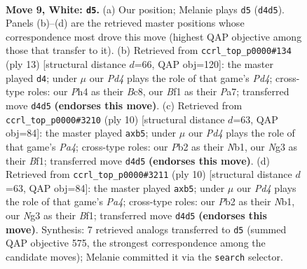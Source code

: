 \documentclass[11pt]{article}
\begin{document}
\clearpage

\begin{figure}[p]\centering
\begin{subfigure}{0.46\textwidth}\centering
\resizebox{\linewidth}{!}{%
\newchessgame
\chessboard[
  setfen={rn1qkbnr/pp4p1/2p3bp/4pp2/2PP3P/6NR/PP3PP1/R1BQKBN1 w Qkq - 0 9},
  showmover=false,
  pgfstyle=straightmove, color=movearrow, markmove={d4-d5}
]}
\caption{}
\end{subfigure}\hfill
\begin{subfigure}{0.46\textwidth}\centering
\resizebox{\linewidth}{!}{%
\newchessgame
\chessboard[
  setfen={rnbqkb1r/pp3ppp/5n2/3pp3/2P5/5NP1/PP2PPBP/RNBQK2R b KQkq - 1 7},
  showmover=false,
  pgfstyle=straightmove, color=movearrow, markmove={d5-d4}
]}
\caption{}
\end{subfigure}
\\[4pt]
\begin{subfigure}{0.46\textwidth}\centering
\resizebox{\linewidth}{!}{%
\newchessgame
\chessboard[
  setfen={rnbqkbnr/p4ppp/2p1p3/1p6/P1pPP3/5N2/1P3PPP/RNBQKB1R w KQkq - 0 6},
  showmover=false,
  pgfstyle=straightmove, color=movearrow, markmove={a4-b5}
]}
\caption{}
\end{subfigure}\hfill
\begin{subfigure}{0.46\textwidth}\centering
\resizebox{\linewidth}{!}{%
\newchessgame
\chessboard[
  setfen={rnbqkbnr/p4ppp/2p1p3/1p6/P1pPP3/5N2/1P3PPP/RNBQKB1R w KQkq - 0 6},
  showmover=false,
  pgfstyle=straightmove, color=movearrow, markmove={a4-b5}
]}
\caption{}
\end{subfigure}
\caption{\textbf{Move 9, White: \texttt{d5}.} (a) Our position; Melanie plays \texttt{d5} (\texttt{d4d5}). Panels (b)--(d) are the retrieved master positions whose correspondence most drove this move (highest QAP objective among those that transfer to it). (b) Retrieved from \texttt{ccrl\_top\_p0000\#134} (ply 13) [structural distance $d$=66, QAP obj=120]: the master played \texttt{d4}; under $\mu$ our \emph{Pd4} plays the role of that game's \emph{Pd4}; cross-type roles: our \emph{P}h4 as their \emph{B}c8, our \emph{B}f1 as their \emph{P}a7; transferred move \texttt{d4d5} \textbf{(endorses this move)}. (c) Retrieved from \texttt{ccrl\_top\_p0000\#3210} (ply 10) [structural distance $d$=63, QAP obj=84]: the master played \texttt{axb5}; under $\mu$ our \emph{Pd4} plays the role of that game's \emph{Pa4}; cross-type roles: our \emph{P}b2 as their \emph{N}b1, our \emph{N}g3 as their \emph{B}f1; transferred move \texttt{d4d5} \textbf{(endorses this move)}. (d) Retrieved from \texttt{ccrl\_top\_p0000\#3211} (ply 10) [structural distance $d$=63, QAP obj=84]: the master played \texttt{axb5}; under $\mu$ our \emph{Pd4} plays the role of that game's \emph{Pa4}; cross-type roles: our \emph{P}b2 as their \emph{N}b1, our \emph{N}g3 as their \emph{B}f1; transferred move \texttt{d4d5} \textbf{(endorses this move)}. Synthesis: 7 retrieved analogs transferred to \texttt{d5} (summed QAP objective 575, the strongest correspondence among the candidate moves); Melanie committed it via the \texttt{search} selector.}
\label{fig:thought-m16}
\end{figure}
\end{document}
